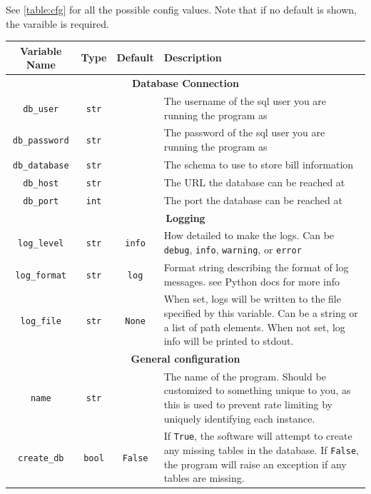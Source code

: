 \documentclass{article}
\begin{document}
See \autoref{table:cfg} for all the possible config values. Note that if no default is shown, the varaible is required.
\begin{table}[h]
    \def\arraystretch{1.5} 
    \begin{tabularx}{\textwidth}{c c c X}
        \hline
        Variable Name & Type & Default & Description \\ 
        \hline
        \multicolumn{4}{c}{\textbf{Database Connection}} \\ 
        \hline
        \verb"db_user" & \verb"str" & & The username of the sql user you are running the program as \\ 
        \hline
        \verb"db_password" & \verb"str" & & The password of the sql user you are running the program as \\ 
        \hline
        \verb"db_database" & \verb"str" & & The schema to use to store bill information \\ 
        \hline
        \verb"db_host" & \verb"str" & & The URL the database can be reached at \\ 
        \hline
        \verb"db_port" & \verb"int" & & The port the database can be reached at \\
        \hline
        \multicolumn{4}{c}{\textbf{Logging}} \\
        \hline 
        \verb"log_level" & \verb"str" & \verb"info" & How detailed to make the logs. Can be \verb"debug", \verb"info", \verb"warning", or \verb"error" \\ 
        \hline 
        \verb"log_format" & \verb"str" & \verb-log-& Format string describing the format of log messages. see Python docs for more info \\ 
        \hline 
        \verb"log_file" & \verb"str" & \verb"None" & When set, logs will be written to the file specified by this variable. Can be a string or a list of path elements. When not set, log info will be printed to stdout. \\ 
        \hline
        \multicolumn{4}{c}{\textbf{General configuration}} \\ 
        \hline
        \verb"name" & \verb"str" & & The name of the program. Should be customized to something unique to you, as this is used to prevent rate limiting by uniquely identifying each instance. \\ 
        \hline 
        \verb"create_db" & \verb"bool" & \verb"False" & If \verb"True", the software will attempt to create any missing tables in the database. If \verb"False", the program will raise an exception if any tables are missing. \\ 

\end{tabularx}
\end{table}
\end{document}
